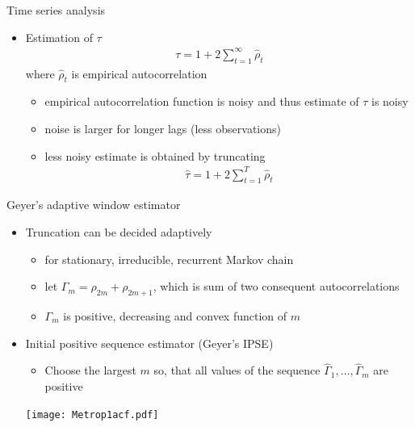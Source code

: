 \documentclass[finnish,english,t]{beamer}
\begin{document}
\begin{frame}{Time series analysis}

    \vspace{-0.5\baselineskip}
  \begin{itemize}
  \item Estimation of $\tau$
    \vspace{-1.5\baselineskip}
    \begin{align*}
      \tau = 1 + 2 \sum_{t=1}^\infty \hat{\rho}_t
    \end{align*}
    where $\hat{\rho}_t$ is empirical autocorrelation \\
    \begin{itemize}
    \item<3-> empirical autocorrelation function is noisy and thus
      estimate of $\tau$ is noisy
    \item<3-> noise is larger for longer lags (less observations)
    \item<4-> less noisy estimate is obtained by truncating
    \begin{align*}
      \hat{\tau} = 1 + 2 \sum_{t=1}^T \hat{\rho}_t
    \end{align*}
    \end{itemize}

    \end{itemize}
\end{frame}

\begin{frame}{Geyer's adaptive window estimator}

  \begin{itemize}
  \item Truncation can be decided adaptively
    \begin{itemize}
    \item for stationary, irreducible, recurrent Markov chain
    \item let $\Gamma_m=\rho_{2m}+\rho_{2m+1}$, which is sum of two
      consequent autocorrelations
    \item $\Gamma_m$ is positive, decreasing and convex function of $m$
    \end{itemize}
    \vspace{0.5\baselineskip}
  \item<2-> Initial positive sequence estimator (Geyer's IPSE)
      \begin{itemize}
        \item Choose the largest $m$ so, that all values of the sequence
        $\hat{\Gamma}_1, \ldots, \hat{\Gamma}_m$ are positive
      \end{itemize}
  \vspace{0.5\baselineskip}
      \texttt{[image: Metrop1acf.pdf]}
  \end{itemize}
\end{frame}
\end{document}
